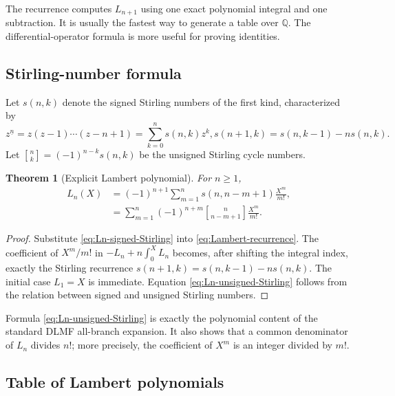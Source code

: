 \documentclass[11pt,oneside]{article}
\numberwithin{equation}{section}
\newtheorem{theorem}{Theorem}[section]
\theoremstyle{definition}
\newcommand{\Q}{\mathbb Q}
\newcommand{\StirlingFirst}[2]{\genfrac{[}{]}{0pt}{}{#1}{#2}}
\begin{document}
The recurrence computes \(L_{n+1}\) using one exact polynomial integral and one
subtraction.  It is usually the fastest way to generate a table over \(\Q\).
The differential-operator formula is more useful for proving identities.

\subsection{Stirling-number formula}

Let \(s(n,k)\) denote the signed Stirling numbers of the first kind,
characterized by
\[
  z^{\underline n}=z(z-1)\cdots(z-n+1)
  =\sum_{k=0}^n s(n,k)z^k,
  s(n+1,k)=s(n,k-1)-n s(n,k).
\]
Let \(\StirlingFirst{n}{k}=(-1)^{n-k}s(n,k)\) be the unsigned Stirling cycle
numbers.

\begin{theorem}[Explicit Lambert polynomial]\label{thm:Lambert-Stirling}
For \(n\ge1\),
\begin{align}
  L_n(X)
  &=(-1)^{n+1}\sum_{m=1}^{n}
       s(n,n-m+1)\frac{X^m}{m!},
       \label{eq:Ln-signed-Stirling}\\
  &=\sum_{m=1}^{n}(-1)^{n+m}
       \StirlingFirst{n}{n-m+1}\frac{X^m}{m!}.
       \label{eq:Ln-unsigned-Stirling}
\end{align}
\end{theorem}

\begin{proof}
Substitute \eqref{eq:Ln-signed-Stirling} into
\eqref{eq:Lambert-recurrence}.  The coefficient of \(X^m/m!\) in
\(-L_n+n\int_0^X L_n\) becomes, after shifting the integral index, exactly the
Stirling recurrence
\(s(n+1,k)=s(n,k-1)-ns(n,k)\).  The initial case
\(L_1=X\) is immediate.  Equation \eqref{eq:Ln-unsigned-Stirling} follows from
the relation between signed and unsigned Stirling numbers.
\end{proof}

Formula \eqref{eq:Ln-unsigned-Stirling} is exactly the polynomial content of the
standard DLMF all-branch expansion.  It also shows that a common denominator of \(L_n\) divides \(n!\); more precisely, the
coefficient of \(X^m\) is an integer divided by \(m!\).

\subsection{Table of Lambert polynomials}
\end{document}
